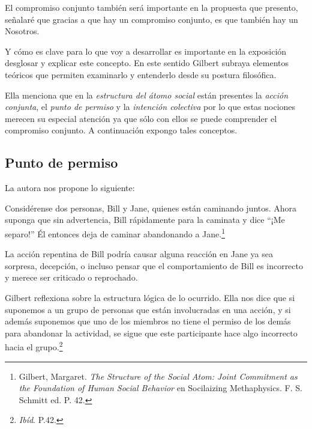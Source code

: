 \documentclass[oneside]{book}
\begin{document}
El compromiso conjunto también será importante en la propuesta que presento, señalaré que gracias a que hay un compromiso conjunto, es que también hay un Nosotros. 

Y cómo es clave para lo que voy a desarrollar es importante en la exposición desglosar y explicar este concepto. En este sentido Gilbert subraya elementos teóricos que permiten examinarlo y entenderlo desde su postura filosófica.

Ella menciona que en la \textit{estructura del átomo social} están presentes la \textit{acción conjunta}, el \textit{punto de permiso} y la \textit{intención colectiva} por lo que estas nociones merecen su especial atención ya que sólo con ellos se puede comprender el compromiso conjunto. A continuación expongo tales conceptos.

\subsection{Punto de permiso}
	

La autora nos propone lo siguiente:

Considérense dos personas, Bill y Jane, quienes  están caminando juntos. Ahora suponga que sin advertencia, Bill rápidamente para la caminata y dice “¡Me separo!” Él entonces deja de caminar abandonando a Jane.\footnote{Gilbert, Margaret. \textit{The Structure of the Social Atom: Joint Commitment as the Foundation of Human Social Behavior} en Socilaizing Methaphysics. F. S. Schmitt ed. P. 42.}

La acción repentina de Bill podría causar alguna reacción en Jane ya sea sorpresa, decepción, o incluso pensar que el comportamiento de Bill es incorrecto y merece ser criticado o reprochado.

Gilbert reflexiona sobre la estructura lógica de lo ocurrido. Ella nos dice que si suponemos a un grupo de personas que están involucradas en una acción, y si además suponemos que uno de los miembros no tiene el permiso de los demás para abandonar la actividad, se sigue que este participante hace algo incorrecto hacia el grupo.\footnote{\textit{Ibíd}. P.42.}
\end{document}
